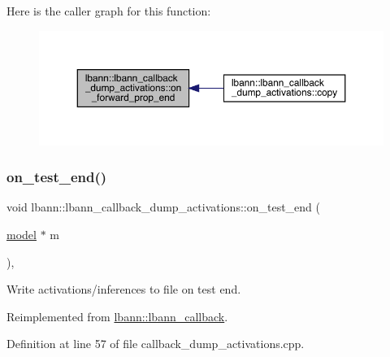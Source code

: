 Here is the caller graph for this function\+:\nopagebreak
\begin{figure}[H]
\begin{center}
\leavevmode
\includegraphics[width=350pt]{classlbann_1_1lbann__callback__dump__activations_acf4429a44ead6ffea303528618bc6572_icgraph}
\end{center}
\end{figure}
\mbox{\label{classlbann_1_1lbann__callback__dump__activations_a5c93f4455b743e3f61600bf092a6d93c}} 
\subsubsection{\texorpdfstring{on\+\_\+test\+\_\+end()}{on\_test\_end()}}
{\footnotesize\ttfamily void lbann\+::lbann\+\_\+callback\+\_\+dump\+\_\+activations\+::on\+\_\+test\+\_\+end (\begin{DoxyParamCaption}\item[{\hyperlink{classlbann_1_1model}{model} $\ast$}]{m }\end{DoxyParamCaption})\hspace{0.3cm}{\ttfamily [override]}, {\ttfamily [virtual]}}

Write activations/inferences to file on test end. 

Reimplemented from \hyperlink{classlbann_1_1lbann__callback_accbad4dd004c1ced33642db6398b2efe}{lbann\+::lbann\+\_\+callback}.



Definition at line 57 of file callback\+\_\+dump\+\_\+activations.\+cpp.


